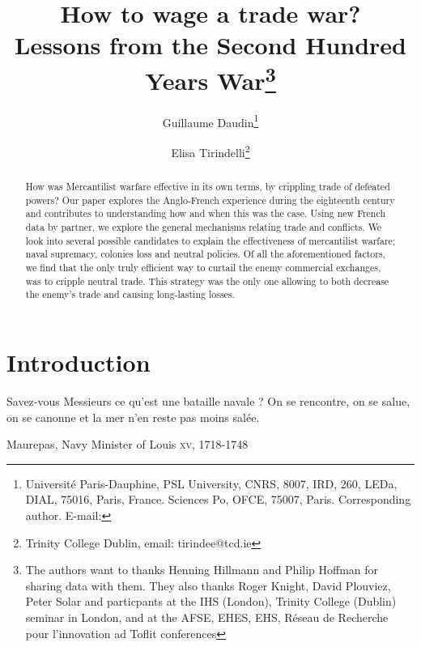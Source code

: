 \documentclass[12pt,a4paper,notitlepage,english]{article}
\author{
  Guillaume Daudin\thanks{Université Paris-Dauphine, PSL University, CNRS, 8007, IRD, 260, LEDa, DIAL, 75016, Paris, France. Sciences Po, OFCE, 75007, Paris. Corresponding author. E-mail: \email{guillaume.daudin@dauphine.psl.eu}}
  \and
  Elisa Tirindelli\thanks{Trinity College Dublin, email: tirindee@tcd.ie}
}
\title{How to wage a trade war? \\ Lessons from the Second Hundred Years War\thanks{The authors want to thanks Henning Hillmann and Philip Hoffman for sharing data with them. They also thanks Roger Knight, David Plouviez, Peter Solar and particpants at the IHS (London), Trinity College (Dublin) seminar in London, and at the AFSE, EHES, EHS, Réseau de Recherche pour l’innovation ad Toflit conferences}}
\date{}
\begin{document}
\maketitle


\begin{abstract}
How was Mercantilist warfare effective in its own terms, by crippling trade of defeated powers? Our paper explores the Anglo-French experience during the eighteenth century and contributes to understanding how and when this was the case. Using new French data by partner, we explore the general mechanisms relating trade and conflicts. We look into several possible candidates to explain the effectiveness of mercantilist warfare; naval supremacy, colonies loss and neutral policies. Of all the aforementioned factors, we find that the only truly efficient way to curtail the enemy commercial exchanges, was to cripple neutral trade. This strategy was the only one allowing to both decrease the enemy's trade and causing long-lasting losses.
\end{abstract}


\section{Introduction} \label{introduction}

\epigraph{Savez-vous Messieurs ce qu’est une bataille navale ? On se rencontre, on se salue, on se canonne et la mer n’en reste pas moins salée.}{Maurepas, Navy Minister of Louis  \textsc{xv}, 1718-1748}



\maketitle

%
\end{document}
